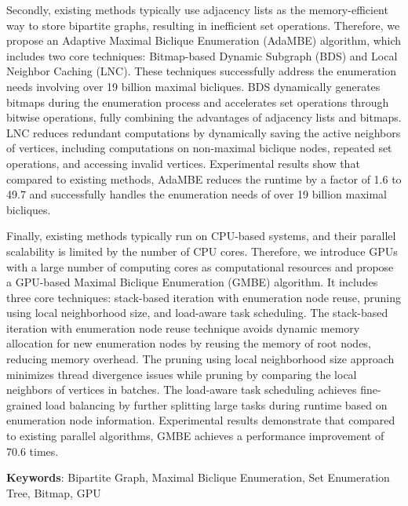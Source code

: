 Secondly, existing methods typically use adjacency lists as the memory-efficient way to store bipartite graphs, resulting in inefficient set operations. Therefore, we propose an Adaptive Maximal Biclique Enumeration (AdaMBE) algorithm, which includes two core techniques: Bitmap-based Dynamic Subgraph (BDS) and Local Neighbor Caching (LNC). These techniques successfully address the enumeration needs involving over 19 billion maximal bicliques. BDS dynamically generates bitmaps during the enumeration process and accelerates set operations through bitwise operations, fully combining the advantages of adjacency lists and bitmaps. LNC reduces redundant computations by dynamically saving the active neighbors of vertices, including computations on non-maximal biclique nodes, repeated set operations, and accessing invalid vertices. Experimental results show that compared to existing methods, AdaMBE reduces the runtime by a factor of 1.6 to 49.7 and successfully handles the enumeration needs of over 19 billion maximal bicliques.

Finally, existing methods typically run on CPU-based systems, and their parallel scalability is limited by the number of CPU cores. Therefore, we introduce GPUs with a large number of computing cores as computational resources and propose a GPU-based Maximal Biclique Enumeration (GMBE) algorithm. It includes three core techniques: stack-based iteration with enumeration node reuse, pruning using local neighborhood size, and load-aware task scheduling. The stack-based iteration with enumeration node reuse technique avoids dynamic memory allocation for new enumeration nodes by reusing the memory of root nodes, reducing memory overhead. The pruning using local neighborhood size approach minimizes thread divergence issues while pruning by comparing the local neighbors of vertices in batches. The load-aware task scheduling achieves fine-grained load balancing by further splitting large tasks during runtime based on enumeration node information. Experimental results demonstrate that compared to existing parallel algorithms, GMBE achieves a performance improvement of 70.6 times.

\vspace{\baselineskip}

\noindent \textbf{Keywords}: Bipartite Graph, Maximal Biclique Enumeration, Set Enumeration Tree, Bitmap, GPU